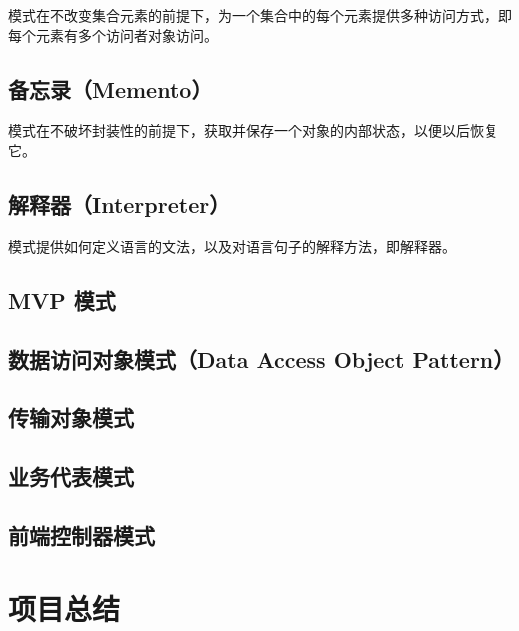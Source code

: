 \documentclass[cn,black,12pt,normal]{elegantnote}
\begin{document}
模式在不改变集合元素的前提下，为一个集合中的每个元素提供多种访问方式，即每个元素有多个访问者对象访问。


\subsection{备忘录（Memento）}

模式在不破坏封装性的前提下，获取并保存一个对象的内部状态，以便以后恢复它。


\subsection{解释器（Interpreter）}

模式提供如何定义语言的文法，以及对语言句子的解释方法，即解释器。


\subsection{MVP 模式}

\subsection{数据访问对象模式（Data Access Object Pattern）}

\subsection{传输对象模式}

\subsection{业务代表模式}

\subsection{前端控制器模式}

\section{项目总结}






\end{document}
